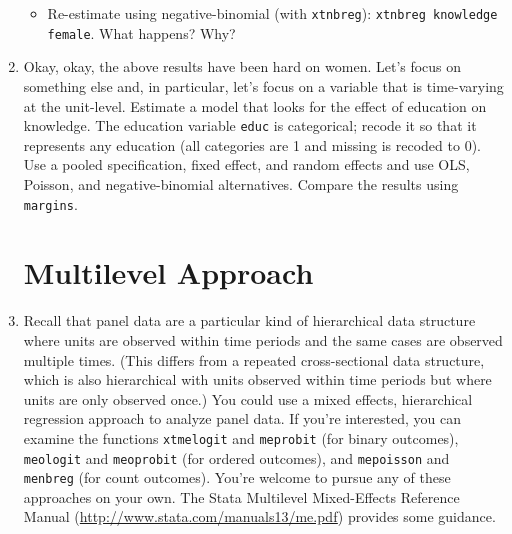 \documentclass[a4paper,12pt]{article}
\begin{document}
\begin{enumerate}
\begin{itemize}
    \item Re-estimate using negative-binomial (with \texttt{xtnbreg}): \texttt{xtnbreg knowledge female}. What happens? Why?
    \end{itemize}

\item Okay, okay, the above results have been hard on women. Let's focus on something else and, in particular, let's focus on a variable that is time-varying at the unit-level. Estimate a model that looks for the effect of education on knowledge. The education variable \texttt{educ} is categorical; recode it so that it represents any education (all categories are 1 and missing is recoded to 0). Use a pooled specification, fixed effect, and random effects and use OLS, Poisson, and negative-binomial alternatives. Compare the results using \texttt{margins}.

\section{Multilevel Approach}

\item Recall that panel data are a particular kind of hierarchical data structure where units are observed within time periods and the same cases are observed multiple times. (This differs from a repeated cross-sectional data structure, which is also hierarchical with units observed within time periods but where units are only observed once.) You could use a mixed effects, hierarchical regression approach to analyze panel data. If you're interested, you can examine the functions \texttt{xtmelogit} and \texttt{meprobit} (for binary outcomes), \texttt{meologit} and \texttt{meoprobit} (for ordered outcomes), and \texttt{mepoisson} and \texttt{menbreg} (for count outcomes). You're welcome to pursue any of these approaches on your own. The Stata Multilevel Mixed-Effects Reference Manual (\url{http://www.stata.com/manuals13/me.pdf}) provides some guidance.

\end{enumerate}
\end{document}
